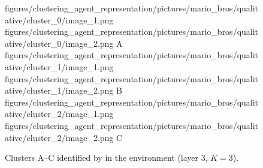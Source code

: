 \begin{figure}[H]
    \qualitativeClusterFigureSetup
    \qualitativeClusterTwo
        {figures/clustering_agent_representation/pictures/mario_bros/qualitative/cluster_0/image_1.png}
        {figures/clustering_agent_representation/pictures/mario_bros/qualitative/cluster_0/image_2.png}
        {A}
    \qualitativeClusterTwo
        {figures/clustering_agent_representation/pictures/mario_bros/qualitative/cluster_1/image_1.png}
        {figures/clustering_agent_representation/pictures/mario_bros/qualitative/cluster_1/image_2.png}
        {B}
    \qualitativeClusterTwo
        {figures/clustering_agent_representation/pictures/mario_bros/qualitative/cluster_2/image_1.png}
        {figures/clustering_agent_representation/pictures/mario_bros/qualitative/cluster_2/image_2.png}
        {C}
    \caption{Clusters A--C identified by  in the \MarioBrosName environment (layer 3, $K=3$).}
    \label{fig:qualitative_mario_bros}
\end{figure}
